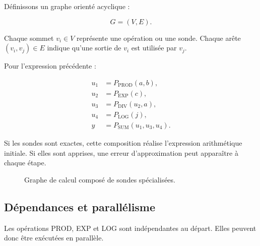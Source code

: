 \documentclass[11pt,a4paper]{article}
\begin{document}
Définissons un graphe orienté acyclique :

\[
G=(V,E).
\]

Chaque sommet $v_i\in V$ représente une opération ou une sonde.
Chaque arête $(v_i,v_j)\in E$ indique qu'une sortie de $v_i$ est
utilisée par $v_j$.

Pour l'expression précédente :

\[
\begin{aligned}
u_1 &= P_{\mathrm{PROD}}(a,b),\\
u_2 &= P_{\mathrm{EXP}}(c),\\
u_3 &= P_{\mathrm{DIV}}(u_2,a),\\
u_4 &= P_{\mathrm{LOG}}(j),\\
y &= P_{\mathrm{SUM}}(u_1,u_3,u_4).
\end{aligned}
\]

Si les sondes sont exactes, cette composition réalise l'expression
arithmétique initiale. Si elles sont apprises, une erreur
d'approximation peut apparaître à chaque étape.

\begin{figure}[H]
\centering
{}
\caption{Graphe de calcul composé de sondes spécialisées.}
\end{figure}

\subsection{Dépendances et parallélisme}

Les opérations PROD, EXP et LOG sont indépendantes au départ.
Elles peuvent donc être exécutées en parallèle.
\end{document}
